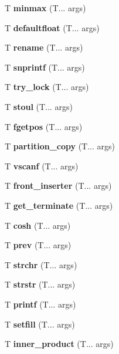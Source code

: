 \begin{DoxyCompactItemize}
\item 
T \textbf{ minmax} (T... args)
\item 
T \textbf{ defaultfloat} (T... args)
\item 
T \textbf{ rename} (T... args)
\item 
T \textbf{ snprintf} (T... args)
\item 
T \textbf{ try\+\_\+lock} (T... args)
\item 
T \textbf{ stoul} (T... args)
\item 
T \textbf{ fgetpos} (T... args)
\item 
T \textbf{ partition\+\_\+copy} (T... args)
\item 
T \textbf{ vscanf} (T... args)
\item 
T \textbf{ front\+\_\+inserter} (T... args)
\item 
T \textbf{ get\+\_\+terminate} (T... args)
\item 
T \textbf{ cosh} (T... args)
\item 
T \textbf{ prev} (T... args)
\item 
T \textbf{ strchr} (T... args)
\item 
T \textbf{ strstr} (T... args)
\item 
T \textbf{ printf} (T... args)
\item 
T \textbf{ setfill} (T... args)
\item 
T \textbf{ inner\+\_\+product} (T... args)
\end{DoxyCompactItemize}
